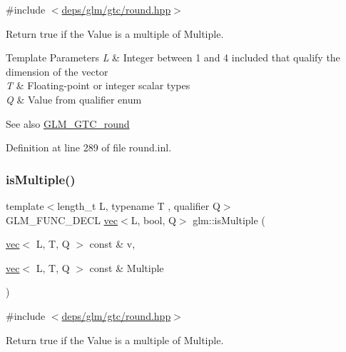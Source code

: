 {\ttfamily \#include $<$\hyperlink{round_8hpp}{deps/glm/gtc/round.\+hpp}$>$}

Return true if the \textquotesingle{}Value\textquotesingle{} is a multiple of \textquotesingle{}Multiple\textquotesingle{}.


\begin{DoxyTemplParams}{Template Parameters}
{\em L} & Integer between 1 and 4 included that qualify the dimension of the vector \\
\hline
{\em T} & Floating-\/point or integer scalar types \\
\hline
{\em Q} & Value from qualifier enum\\
\hline
\end{DoxyTemplParams}
\begin{DoxySeeAlso}{See also}
\hyperlink{group__gtc__round}{G\+L\+M\+\_\+\+G\+T\+C\+\_\+round} 
\end{DoxySeeAlso}


Definition at line 289 of file round.\+inl.

\mbox{\label{group__gtc__round_gabb4360e38c0943d8981ba965dead519d}} 
\subsubsection{\texorpdfstring{is\+Multiple()}{isMultiple()}\hspace{0.1cm}{\footnotesize\ttfamily [3/3]}}
{\footnotesize\ttfamily template$<$length\+\_\+t L, typename T , qualifier Q$>$ \\
G\+L\+M\+\_\+\+F\+U\+N\+C\+\_\+\+D\+E\+CL \hyperlink{structglm_1_1vec}{vec}$<$L, bool, Q$>$ glm\+::is\+Multiple (\begin{DoxyParamCaption}\item[{\hyperlink{structglm_1_1vec}{vec}$<$ L, T, Q $>$ const \&}]{v,  }\item[{\hyperlink{structglm_1_1vec}{vec}$<$ L, T, Q $>$ const \&}]{Multiple }\end{DoxyParamCaption})}



{\ttfamily \#include $<$\hyperlink{round_8hpp}{deps/glm/gtc/round.\+hpp}$>$}

Return true if the \textquotesingle{}Value\textquotesingle{} is a multiple of \textquotesingle{}Multiple\textquotesingle{}.


